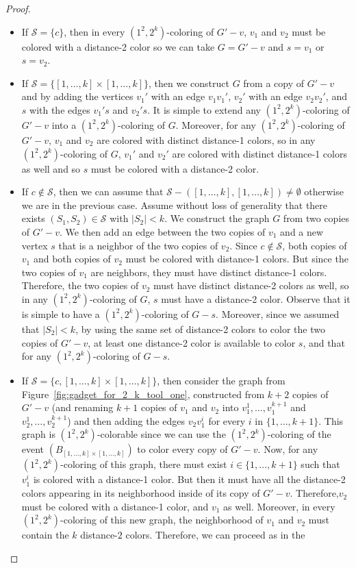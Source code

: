 \documentclass{article}
\newcommand{\colo}[2]{(1^{#1}, 2^{#2})}
\begin{document}
\begin{proof}
\begin{itemize}
        \item If $\mathcal{S} = \{c\}$, then in every $\colo{2}{k}$-coloring of $G' - v$, $v_1$ and $v_2$ must be colored with a distance-2 color so we can take $G = G' - v$ and $s = v_1$ or $s = v_2$.
        \item If $\mathcal{S} = \{[1, \dots, k] \times [1, \dots, k]\}$, then we construct $G$ from a copy of $G' - v$ and by adding the vertices $v_1'$ with an edge $v_1v_1'$, $v_2'$ with an edge $v_2v_2'$, and $s$ with the edges $v_1's$ and $v_2's$. It is simple to extend any $\colo{2}{k}$-coloring of $G' - v$ into a $\colo{2}{k}$-coloring of $G$. Moreover, for any $\colo{2}{k}$-coloring of $G' - v$, $v_1$ and $v_2$ are colored with distinct distance-1 colors, so in any $\colo{2}{k}$-coloring of $G$, $v_1'$ and $v_2'$ are colored with distinct distance-1 colors as well and so $s$ must be colored with a distance-2 color.
        \item If $c \not\in\mathcal{S}$, then we can assume that $\mathcal{S} - ([1, \dots, k], [1, \dots, k]) \neq \emptyset$ otherwise we are in the previous case. Assume without loss of generality that there exists $(S_1, S_2) \in \mathcal{S}$ with $|S_2| < k$. We construct the graph $G$ from two copies of $G' - v$. We then add an edge between the two copies of $v_1$ and a new vertex $s$ that is a neighbor of the two copies of $v_2$. Since $c \not\in\mathcal{S}$, both copies of $v_1$ and both copies of $v_2$ must be colored with distance-1 colors. But since the two copies of $v_1$ are neighbors, they must have distinct distance-1 colors. Therefore, the two copies of $v_2$ must have distinct distance-2 colors as well, so in any $\colo{2}{k}$-coloring of $G$, $s$ must have a distance-2 color. Observe that it is simple to have a $\colo{2}{k}$-coloring of $G - s$. Moreover, since we assumed that $|S_2| < k$, by using the same set of distance-2 colors to color the two copies of $G' - v$, at least one distance-2 color is available to color $s$, and that for any $\colo{2}{k}$-coloring of $G - s$.
        \item If $\mathcal{S} = \{c, [1, \dots, k] \times [1, \dots, k]\}$, then consider the graph from Figure~\ref{fig:gadget_for_2_k_tool_one}, constructed from $k + 2$ copies of $G' - v$ (and renaming $k + 1$ copies of $v_1$ and $v_2$ into $v_1^1, \dots, v_1^{k + 1}$ and $v_2^1, \dots, v_2^{k + 1}$) and then adding the edges $v_2v_1^i$ for every $i$ in $\{1, \dots, k + 1\}$. This graph is $\colo{2}{k}$-colorable since we can use the $\colo{2}{k}$-coloring of the event $(B_{[1, \dots, k] \times [1, \dots, k]})$ to color every copy of $G' - v$. Now, for any $\colo{2}{k}$-coloring of this graph, there must exist $i \in \{1, \dots, k + 1\}$ such that $v_1^i$ is colored with a distance-1 color. But then it must have all the distance-2 colors appearing in its neighborhood inside of its copy of $G' - v$. Therefore,$v_2$ must be colored with a distance-1 color, and $v_1$ as well. Moreover, in every  $\colo{2}{k}$-coloring of this new graph, the neighborhood of $v_1$ and $v_2$ must contain the $k$ distance-$2$ colors. Therefore, we can proceed as in the 

\end{itemize}
\end{proof}
\end{document}
